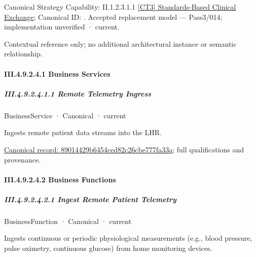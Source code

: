 {\small Canonical Strategy Capability: II.1.2.3.1.1 \hyperref[element:319398b3f4b54bac85b61cb5ecd392b1]{[CT3] Standards-Based Clinical Exchange}; Canonical ID: \texttt{}. Accepted replacement model — Pass3/014; implementation unverified · current.}\par
Contextual reference only; no additional architectural instance or semantic relationship.\par
\paragraph*{III.4.9.2.4.1 Business Services}
\label{navigation:III.4.9.2.4.1}

\subparagraph*{III.4.9.2.4.1.1 Remote Telemetry Ingress}
\label{navigation:III.4.9.2.4.1.1}

\label{element:89014429b6454ced82c26cbe777fa33a}
{\small BusinessService · Canonical · current}\par

Ingests remote patient data streams into the LHR.


{\footnotesize \href{../../../../../../../../continuum/business/business-service/89014429b6454ced82c26cbe777fa33a.md}{Canonical record: 89014429b6454ced82c26cbe777fa33a}; full qualifications and provenance.}\par
\paragraph*{III.4.9.2.4.2 Business Functions}
\label{navigation:III.4.9.2.4.2}

\subparagraph*{III.4.9.2.4.2.1 Ingest Remote Patient Telemetry}
\label{navigation:III.4.9.2.4.2.1}

\label{element:cb03c3040e1c4a4a9fdadb2502113014}
{\small BusinessFunction · Canonical · current}\par

Ingests continuous or periodic physiological measurements (e.g., blood pressure, pulse oximetry, continuous glucose) from home monitoring devices.


